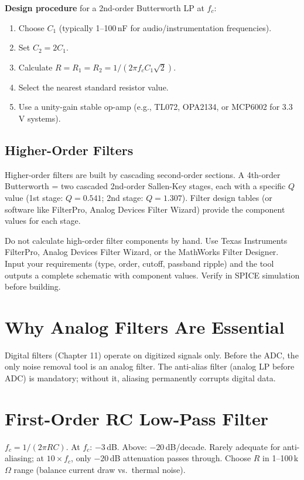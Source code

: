 \documentclass[11pt,letterpaper,twoside,openany]{book}
\begin{document}
\textbf{Design procedure} for a 2nd-order Butterworth LP at $f_c$:
\begin{enumerate}[nosep,leftmargin=1.5em]
\item Choose $C_1$ (typically 1--100\,nF for audio/instrumentation frequencies).
\item Set $C_2 = 2 C_1$.
\item Calculate $R = R_1 = R_2 = 1/(2\pi f_c C_1 \sqrt{2})$.
\item Select the nearest standard resistor value.
\item Use a unity-gain stable op-amp (e.g., TL072, OPA2134, or MCP6002 for 3.3\,V systems).
\end{enumerate}

\subsection{Higher-Order Filters}
Higher-order filters are built by cascading second-order sections. A 4th-order Butterworth = two cascaded 2nd-order Sallen-Key stages, each with a specific $Q$ value (1st stage: $Q = 0.541$; 2nd stage: $Q = 1.307$). Filter design tables (or software like FilterPro, Analog Devices Filter Wizard) provide the component values for each stage.

\begin{tipbox}
Do not calculate high-order filter components by hand. Use Texas Instruments FilterPro, Analog Devices Filter Wizard, or the MathWorks Filter Designer. Input your requirements (type, order, cutoff, passband ripple) and the tool outputs a complete schematic with component values. Verify in SPICE simulation before building.
\end{tipbox}


\section{Why Analog Filters Are Essential}
Digital filters (Chapter 11) operate on digitized signals only. Before the ADC, the only noise removal tool is an analog filter. The anti-alias filter (analog LP before ADC) is mandatory; without it, aliasing permanently corrupts digital data.

\section{First-Order RC Low-Pass Filter}
$f_c = 1/(2\pi RC)$. At $f_c$: $-3$\,dB. Above: $-20$\,dB/decade. Rarely adequate for anti-aliasing; at $10\times f_c$, only $-20$\,dB attenuation passes through. Choose $R$ in 1--100\,k$\Omega$ range (balance current draw vs.\ thermal noise).
\end{document}
